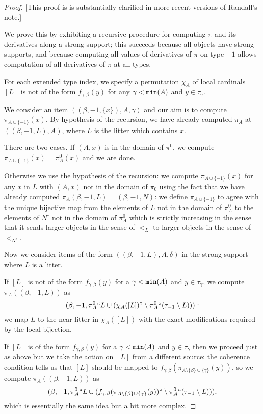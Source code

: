 \begin{proof}
  [This proof is is substantially clarified in more recent versions of Randall’s note.]

  We prove this by exhibiting a recursive procedure for computing $\pi$ and its derivatives along a strong support;  this succeeds because all objects have strong supports, and because computing all values of derivatives of $\pi$ on type $-1$ allows computation of all derivatives of $\pi$ at all types.

For each extended type index, we specify a permutation $\chi_A$ of local cardinals $[L]$ is not of the form $f_{\gamma,\beta}(y)$ for any $\gamma<{\tt min}(A)$ and $y \in \tau_\gamma$.

We consider an item $((\beta,-1,\{x\}),A,\gamma)$ and our aim is to compute $\pi_{A \cup \{-1\}}(x)$.  By hypothesis of the recursion, we have already
computed $\pi_A$ at $((\beta,-1,L),A)$, where $L$ is the litter which contains $x$.

There are two cases.  If $(A,x)$ is in the domain of $\pi^0$, we compute $\pi_{A \cup \{-1\}}(x) = \pi^0_A(x)$ and we are done.

Otherwise we use the hypothesis of the recursion:  we compute $\pi_{A \cup \{-1\}}(x)$ for any $x$ in $L$ with $(A,x)$ not in the domain of $\pi_0$ using the fact that we have already computed $\pi_A(\beta,-1,L) = (\beta,-1,N)$:  we define $\pi_{A \cup \{-1\}}$ to agree with the unique bijective map from the
elements of $L$ not in the domain of $\pi^0_A$ to the elements of $N^\circ$ not in the domain of $\pi^0_A$ which is strictly increasing in the sense that it sends larger objects in the sense of $<_L$ to larger objects in the sense of $<_{N^\circ}$.

Now we consider items of the form $((\beta,-1,L),A,\delta)$ in the strong support where $L$ is a litter.

If $[L]$ is not of the form $f_{\gamma,\beta}(y)$ for a $\gamma<{\tt min}(A)$ and $y \in \tau_\gamma$,
we compute $\pi_A((\beta,-1,L))$ as $$(\beta,-1,{\pi^0_A}``L \cup (\chi_A([L])^\circ \setminus {\pi^0_A}``(\tau_{-1} \setminus L))):$$ we map
$L$ to the near-litter in $\chi_A([L])$ with the exact modifications required by the local bijection.

If $[L]$ is of the form $f_{\gamma,\beta}(y)$ for a $\gamma<{\tt min}(A)$ and $y \in \tau_\gamma$ then we proceed just as above but we take the action on $[L]$ from a different source:
the coherence condition tells us that $[L]$ should be mapped to $f_{\gamma,\beta}(\pi_{A \setminus \{\beta\} \cup \{\gamma\}}(y))$, so we compute
$\pi_A((\beta,-1,L))$ as $$(\beta,-1,{\pi^0_A}``L \cup (f_{\gamma,\beta}(\pi_{A \setminus \{\beta\} \cup \{\gamma\}}(y))^\circ \setminus {\pi^0_A}``(\tau_{-1}\setminus L))),$$  which is essentially the same idea but a bit more complex.


\end{proof}
